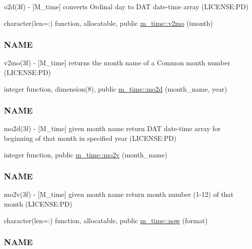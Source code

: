\begin{DoxyCompactItemize}
\begin{DoxyCompactList}
o2d(3f) -\/ \mbox{[}M\+\_\+time\mbox{]} converts Ordinal day to D\+AT date-\/time array (L\+I\+C\+E\+N\+SE\+:PD) \end{DoxyCompactList}\item 
character(len=\+:) function, allocatable, public \mbox{\hyperlink{namespacem__time_a6f28cf00e4998bb50bb503f5e4bd3f77}{m\+\_\+time\+::v2mo}} (imonth)
\begin{DoxyCompactList}\small\item\em \subsubsection*{N\+A\+ME}

v2mo(3f) -\/ \mbox{[}M\+\_\+time\mbox{]} returns the month name of a Common month number (L\+I\+C\+E\+N\+SE\+:PD) \end{DoxyCompactList}\item 
integer function, dimension(8), public \mbox{\hyperlink{namespacem__time_a8188c7ed4e592c4f2388d28c75486726}{m\+\_\+time\+::mo2d}} (month\+\_\+name, year)
\begin{DoxyCompactList}\small\item\em \subsubsection*{N\+A\+ME}

mo2d(3f) -\/ \mbox{[}M\+\_\+time\mbox{]} given month name return D\+AT date-\/time array for beginning of that month in specified year (L\+I\+C\+E\+N\+SE\+:PD) \end{DoxyCompactList}\item 
integer function, public \mbox{\hyperlink{namespacem__time_ad7bf0886754757e8961e562f06cf3bb7}{m\+\_\+time\+::mo2v}} (month\+\_\+name)
\begin{DoxyCompactList}\small\item\em \subsubsection*{N\+A\+ME}

mo2v(3f) -\/ \mbox{[}M\+\_\+time\mbox{]} given month name return month number (1-\/12) of that month (L\+I\+C\+E\+N\+SE\+:PD) \end{DoxyCompactList}\item 
character(len=\+:) function, allocatable, public \mbox{\hyperlink{namespacem__time_a6b5e87be0e510ff268c1ecfbf67a3bdb}{m\+\_\+time\+::now}} (format)
\begin{DoxyCompactList}\small\item\em \subsubsection*{N\+A\+ME}


\end{DoxyCompactList}
\end{DoxyCompactItemize}
